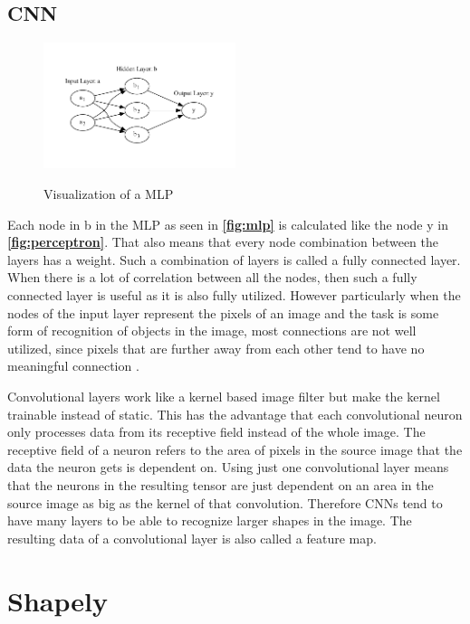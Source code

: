 \documentclass[10pt]{book}
\newcommand{\figureref}[1]{\textbf{\autoref{#1}}}
\begin{document}
\subsection{CNN}

\begin{figure}
  \caption{Visualization of a \ac{MLP}}
  \includegraphics[width=0.5\textwidth]{graph/mlp}
  \label{fig:mlp} 
\end{figure}

Each node in b in the \ac{MLP} as seen in \figureref{fig:mlp} is calculated like the node y in \figureref{fig:perceptron}. That also means that every node combination between the layers has a weight. Such a combination of layers is called a fully connected layer. When there is a lot of correlation between all the nodes, then such a fully connected layer is useful as it is also fully utilized. However particularly when the nodes of the input layer represent the pixels of an image and the task is some form of recognition of objects in the image, most connections are not well utilized, since pixels that are further away from each other tend to have no meaningful connection \cite{aghdam2017guide}.

Convolutional layers work like a kernel based image filter but make the kernel trainable instead of static. This has the advantage that each convolutional neuron only processes data from its receptive field instead of the whole image. The receptive field of a neuron refers to the area of pixels in the source image that the data the neuron gets is dependent on. Using just one convolutional layer means that the neurons in the resulting tensor are just dependent on an area in the source image as big as the kernel of that convolution. Therefore \acp{CNN} tend to have many layers to be able to recognize larger shapes in the image. The resulting data of a convolutional layer is also called a feature map. 

\section{Shapely}
\end{document}
